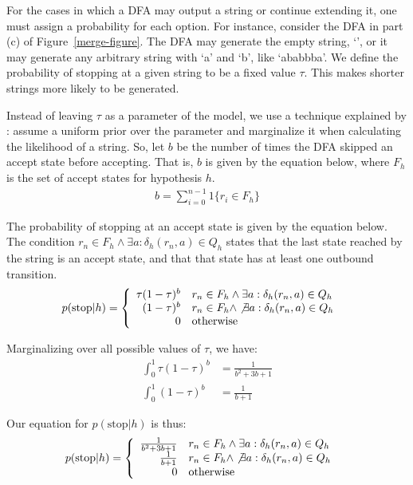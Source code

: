 \documentclass[10pt,letterpaper]{article}
\begin{document}
For the cases in which a DFA may output a string or continue extending it, one must assign a probability for each option. For instance, consider the DFA in part (c) of Figure~\ref{merge-figure}. The DFA may generate the empty string, `', or it may generate any arbitrary string with `a' and `b', like `ababbba'. We define the probability of stopping at a given string to be a fixed value $\tau$. This makes shorter strings more likely to be generated.

Instead of leaving $\tau$ as a parameter of the model, we use a technique explained by : assume a uniform prior over the parameter and marginalize it when calculating the likelihood of a string. So, let $b$ be the number of times the DFA skipped an accept state before accepting. That is, $b$ is given by the equation below, where $F_h$ is the set of accept states for hypothesis $h$.
\begin{align*}
	b = \sum_{i=0}^{n-1} 1 \{ r_i \in F_h\}
\end{align*}

The probability of stopping at an accept state is given by the equation below. The condition $r_n \in F_h \wedge \exists a : \delta_h(r_n, a)\in Q_h$ states that the last state reached by the string is an accept state, and that that state has at least one outbound transition.
\begin{align*}
	p(\text{stop}|h) &= \left\{
		\begin{array}{rl}
		\tau (1-\tau)^b & r_n \in F_h \wedge \exists a : \delta_h(r_n, a)\in Q_h
		\\ (1-\tau)^b & r_n \in F_h \wedge \not \exists a : \delta_h(r_n, a)\in Q_h
		\\ 0 & \text{otherwise}
		\end{array}
		\right.
\end{align*}

Marginalizing over all possible values of $\tau$, we have:
\begin{align*}
	\int_0^1 \tau (1-\tau)^b &= \frac{1}{b^2+3b+1}
	\\ \int_0^1 (1-\tau)^b &= \frac{1}{b+1}
\end{align*}

Our equation for $p(\text{stop}|h)$ is thus:
\begin{align*}
	p(\text{stop}|h) &= \left\{
		\begin{array}{rl}
		\frac{1}{b^2+3b+1} & r_n \in F_h \wedge \exists a : \delta_h(r_n, a) \in Q_h
		\\ \frac{1}{b+1} & r_n \in F_h \wedge \not \exists a : \delta_h(r_n, a) \in Q_h
		\\ 0 & \text{otherwise}
		\end{array}
		\right.
\end{align*}
\end{document}
